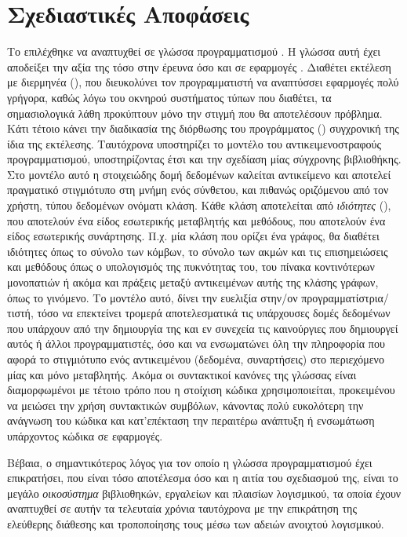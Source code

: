 \section{Σχεδιαστικές Αποφάσεις}
Το  επιλέχθηκε να αναπτυχθεί σε γλώσσα προγραμματισμού .
Η γλώσσα αυτή έχει αποδείξει την αξία της τόσο στην έρευνα όσο και σε εφαρμογές \cite{PythonHype}.
Διαθέτει εκτέλεση με διερμηνέα (), που διευκολύνει τον προγραμματιστή να αναπτύσσει εφαρμογές πολύ γρήγορα, καθώς λόγω του οκνηρού συστήματος τύπων που διαθέτει, τα σημασιολογικά λάθη προκύπτουν μόνο την στιγμή που θα αποτελέσουν πρόβλημα.
Κάτι τέτοιο κάνει την διαδικασία της διόρθωσης του προγράμματος () συγχρονική της ίδια της εκτέλεσης.
Ταυτόχρονα υποστηρίζει το μοντέλο του αντικειμενοστραφούς προγραμματισμού, υποστηρίζοντας έτσι και την σχεδίαση μίας σύγχρονης βιβλιοθήκης.
Στο μοντέλο αυτό η στοιχειώδης δομή δεδομένων καλείται αντικείμενο και αποτελεί πραγματικό στιγμιότυπο στη μνήμη ενός σύνθετου, και πιθανώς οριζόμενου από τον χρήστη, τύπου δεδομένων ονόματι κλάση.
Κάθε κλάση αποτελείται από  \textit{ιδιότητες} (), που αποτελούν ένα είδος εσωτερικής μεταβλητής και μεθόδους, που αποτελούν ένα είδος εσωτερικής συνάρτησης.
Π.χ. μία κλάση που ορίζει ένα γράφος, θα διαθέτει ιδιότητες όπως το σύνολο των κόμβων, το σύνολο των ακμών και τις επισημειώσεις και μεθόδους όπως ο υπολογισμός της πυκνότητας του, του πίνακα κοντινότερων μονοπατιών ή ακόμα και πράξεις μεταξύ αντικειμένων αυτής της κλάσης γράφων, όπως το γινόμενο.
Το μοντέλο αυτό, δίνει την ευελιξία στην/ον προγραμματίστρια/τιστή, τόσο να επεκτείνει τρομερά αποτελεσματικά τις υπάρχουσες δομές δεδομένων που υπάρχουν από την δημιουργία της και εν συνεχεία τις καινούργιες που δημιουργεί αυτός ή άλλοι προγραμματιστές, όσο και να ενσωματώνει όλη την πληροφορία που αφορά το στιγμιότυπο ενός αντικειμένου (δεδομένα, συναρτήσεις) στο περιεχόμενο μίας και μόνο μεταβλητής.
Ακόμα οι συντακτικοί κανόνες της γλώσσας είναι διαμορφωμένοι με τέτοιο τρόπο που η στοίχιση κώδικα χρησιμοποιείται, προκειμένου να μειώσει την χρήση συντακτικών συμβόλων, κάνοντας πολύ ευκολότερη την ανάγνωση του κώδικα και κατ'επέκταση την περαιτέρω ανάπτυξη ή ενσωμάτωση υπάρχοντος κώδικα σε εφαρμογές.\par
Bέβαια, ο σημαντικότερος λόγος για τον οποίο η γλώσσα προγραμματισμού  έχει επικρατήσει, που είναι τόσο αποτέλεσμα όσο και η αιτία του σχεδιασμού της, είναι το μεγάλο \textit{οικοσύστημα} βιβλιοθηκών, εργαλείων και πλαισίων λογισμικού, τα οποία έχουν αναπτυχθεί σε αυτήν τα τελευταία χρόνια ταυτόχρονα με την επικράτηση της ελεύθερης διάθεσης και τροποποίησης τους μέσω των αδειών ανοιχτού λογισμικού.

